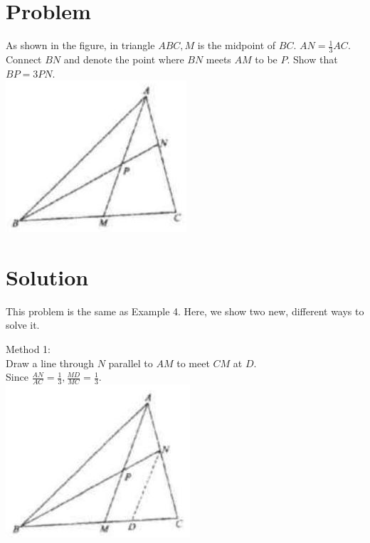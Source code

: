 \documentclass{article}
\begin{document}
\section*{Problem}
As shown in the figure, in triangle \(A B C, M\) is the midpoint of \(B C\). \(A N=\frac{1}{3} A C\). Connect \(B N\) and denote the point where \(B N\) meets \(A M\) to be \(P\). Show that \(B P=3 P N\).\\
\centering
\includegraphics[width=\textwidth]{images/129(4).jpg}

\section*{Solution}
This problem is the same as Example 4. Here, we show two new, different ways to solve it.


Method 1:\\
Draw a line through \(N\) parallel to \(A M\) to meet \(C M\) at \(D\).\\
Since \(\frac{A N}{A C}=\frac{1}{3}, \frac{M D}{M C}=\frac{1}{3}\).\\
\centering
\includegraphics[width=\textwidth]{images/139.jpg}
\end{document}
